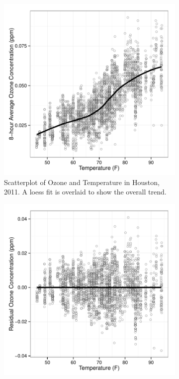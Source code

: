 \documentclass[11pt]{isuthesis}\usepackage[]{graphicx}\usepackage[]{color}
\begin{document}
\begin{figure}[h!tbp]\centering
\begin{subfigure}[b]{.45\textwidth}
  \centering
  \includegraphics[width=\textwidth]{fig-example1}
  \caption[Scatterplot of Ozone and Temperature in Houston, 2011.]{\small Scatterplot of Ozone and Temperature in Houston, 2011. A loess fit is overlaid to show the overall trend.  \label{fig:example1}}
\end{subfigure}\hfill
\begin{subfigure}[b]{.45\textwidth}
  \centering
  \includegraphics[width=\textwidth]{fig-example2}

\end{subfigure}
\end{figure}
\end{document}
